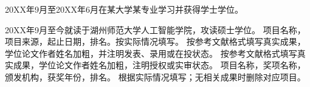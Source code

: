 20XX年9月至20XX年6月在某大学某专业学习并获得学士学位。

20XX年9月至今就读于湖州师范大学人工智能学院，攻读硕士学位。
项目名称，项目来源，起止日期，排名。按实际情况填写。
按参考文献格式填写真实成果，学位论文作者姓名加粗，并注明发表、录用或在投状态。
按参考文献格式填写真实成果，学位论文作者姓名加粗，注明授权或实审状态。
项目名称，奖项名称，颁发机构，获奖年份，排名。
根据实际情况填写；无相关成果时删除对应项目。
